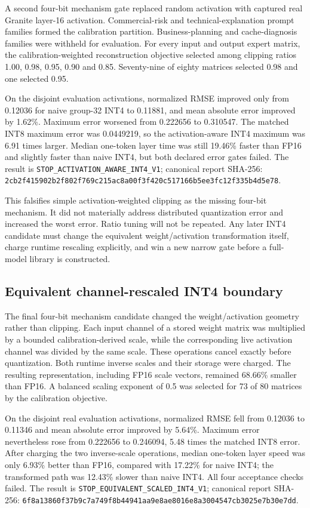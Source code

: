 A second four-bit mechanism gate replaced random activation with captured real
Granite layer-16 activation. Commercial-risk and technical-explanation prompt
families formed the calibration partition. Business-planning and cache-diagnosis
families were withheld for evaluation. For every input and output expert matrix,
the calibration-weighted reconstruction objective selected among clipping
ratios 1.00, 0.98, 0.95, 0.90 and 0.85. Seventy-nine of eighty matrices selected
0.98 and one selected 0.95.

On the disjoint evaluation activations, normalized RMSE improved only from
0.12036 for naive group-32 INT4 to 0.11881, and mean absolute error improved by
1.62\%. Maximum error worsened from 0.222656 to 0.310547. The matched INT8
maximum error was 0.0449219, so the activation-aware INT4 maximum was 6.91 times
larger. Median one-token layer time was still 19.46\% faster than FP16 and
slightly faster than naive INT4, but both declared error gates failed. The
result is \texttt{STOP\_ACTIVATION\_AWARE\_INT4\_V1}; canonical report SHA-256:
\texttt{2cb2f415902b2f802f769c215ac8a00f3f420c517166b5ee3fc12f335b4d5e78}.

This falsifies simple activation-weighted clipping as the missing four-bit
mechanism. It did not materially address distributed quantization error and
increased the worst error. Ratio tuning will not be repeated. Any later INT4
candidate must change the equivalent weight/activation transformation itself,
charge runtime rescaling explicitly, and win a new narrow gate before a
full-model library is constructed.

\subsection{Equivalent channel-rescaled INT4 boundary}

The final four-bit mechanism candidate changed the weight/activation geometry
rather than clipping. Each input channel of a stored weight matrix was
multiplied by a bounded calibration-derived scale, while the corresponding live
activation channel was divided by the same scale. These operations cancel
exactly before quantization. Both runtime inverse scales and their storage were
charged. The resulting representation, including FP16 scale vectors, remained
68.66\% smaller than FP16. A balanced scaling exponent of 0.5 was selected for
73 of 80 matrices by the calibration objective.

On the disjoint real evaluation activations, normalized RMSE fell from 0.12036
to 0.11346 and mean absolute error improved by 5.64\%. Maximum error nevertheless
rose from 0.222656 to 0.246094, 5.48 times the matched INT8 error. After charging
the two inverse-scale operations, median one-token layer speed was only 6.93\%
better than FP16, compared with 17.22\% for naive INT4; the transformed path was
12.43\% slower than naive INT4. All four acceptance checks failed. The result is
\texttt{STOP\_EQUIVALENT\_SCALED\_INT4\_V1}; canonical report SHA-256:
\texttt{6f8a13860f37b9c7a749f8b44941aa9e8ae8016e8a3004547cb3025e7b30e7dd}.

